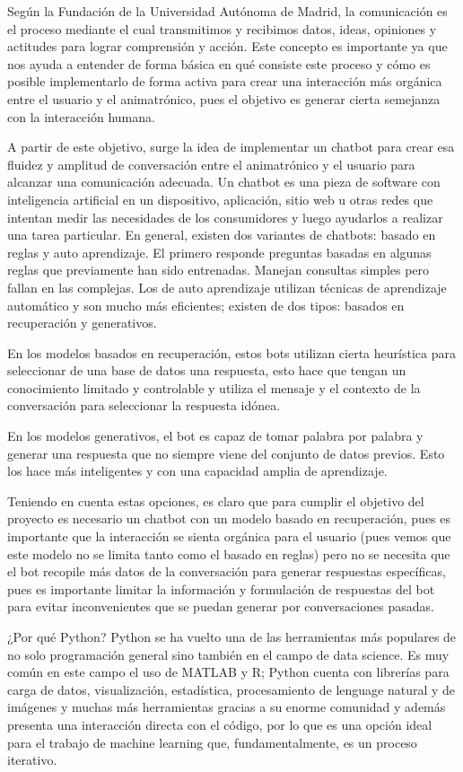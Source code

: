 Según la Fundación de la Universidad Autónoma de Madrid, la comunicación es el proceso mediante el cual transmitimos y recibimos datos, ideas, opiniones y actitudes para lograr comprensión y acción. Este concepto es importante ya que nos ayuda a entender de forma básica en qué consiste este proceso y cómo es posible implementarlo de forma activa para crear una interacción más orgánica entre el usuario y el animatrónico, pues el objetivo es generar cierta semejanza con la interacción humana.

A partir de este objetivo, surge la idea de implementar un chatbot para crear esa fluidez y amplitud de conversación entre el animatrónico y el usuario para alcanzar una comunicación adecuada. Un chatbot es una pieza de software con inteligencia artificial en un dispositivo, aplicación, sitio web u otras redes que intentan medir las necesidades de los consumidores y luego ayudarlos a realizar una tarea particular. En general, existen dos variantes de chatbots: basado en reglas y auto aprendizaje. El primero responde preguntas basadas en algunas reglas que previamente han sido entrenadas. Manejan consultas simples pero fallan en las complejas. Los de auto aprendizaje utilizan técnicas de aprendizaje automático y son mucho más eficientes; existen de dos tipos: basados en recuperación y generativos.

En los modelos basados en recuperación, estos bots utilizan cierta heurística para seleccionar de una base de datos una respuesta, esto hace que tengan un conocimiento limitado y controlable y utiliza el mensaje y el contexto de la conversación para seleccionar la respuesta idónea.

En los modelos generativos, el bot es capaz de tomar palabra por palabra y generar una respuesta que no siempre viene del conjunto de datos previos. Esto los hace más inteligentes y con una capacidad amplia de aprendizaje.

Teniendo en cuenta estas opciones, es claro que para cumplir el objetivo del proyecto es necesario un chatbot con un modelo basado en recuperación, pues es importante que la interacción se sienta orgánica para el usuario (pues vemos que este modelo no se limita tanto como el basado en reglas) pero no se necesita que el bot recopile más datos de la conversación para generar respuestas específicas, pues es importante limitar la información y formulación de respuestas del bot para evitar inconvenientes que se puedan generar por conversaciones pasadas.

¿Por qué Python? Python se ha vuelto una de las herramientas más populares de no solo programación general sino también en el campo de data science. Es muy común en este campo el uso de MATLAB y R; Python cuenta con librerías para carga de datos, visualización, estadística, procesamiento de lenguage natural y de imágenes y muchas más herramientas gracias a su enorme comunidad y además presenta una interacción directa con el código, por lo que es una opción ideal para el trabajo de machine learning que, fundamentalmente, es un proceso iterativo.

